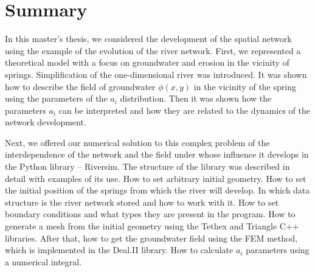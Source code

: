 \documentclass[]{pracamgr}
\begin{document}
  \chapter{Summary}

    In this master's thesis, we considered the development of the spatial network using the example of the evolution of the river network. First, we represented a theoretical model with a focus on groundwater and erosion in the vicinity of springs. Simplification of the one-dimensional river was introduced. It was shown how to describe the field of groundwater $\phi(x, y)$ in the vicinity of the spring using the parameters of the $a_i$ distribution. Then it was shown how the parameters $a_i$ can be interpreted and how they are related to the dynamics of the network development.\par

    Next, we offered our numerical solution to this complex problem of the interdependence of the network and the field under whose influence it develops in the Python library -- Riversim. The structure of the library was described in detail with examples of its use. How to set arbitrary initial geometry. How to set the initial position of the springs from which the river will develop. In which data structure is the river network stored and how to work with it. How to set boundary conditions and what types they are present in the program. How to generate a mesh from the initial geometry using the Tethex and Triangle C++ libraries. After that, how to get the groundwater field using the FEM method, which is implemented in the Deal.II library. How to calculate $a_i$ parameters using a numerical integral.\par
\end{document}
